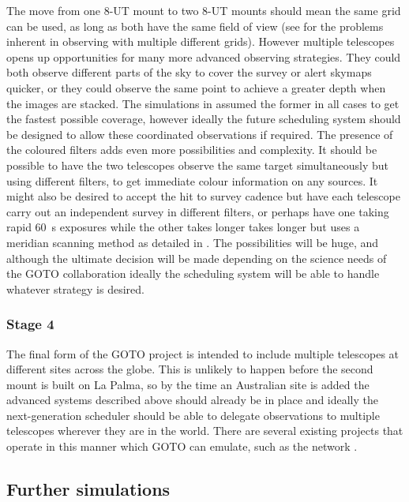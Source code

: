\begin{colsection}
\begin{colsection}
The move from one 8-UT mount to two 8-UT mounts should mean the same grid can be used, as long as both have the same field of view (see  for the problems inherent in observing with multiple different grids). However multiple telescopes opens up opportunities for many more advanced observing strategies. They could both observe different parts of the sky to cover the survey or alert skymaps quicker, or they could observe the same point to achieve a greater depth when the images are stacked. The simulations in  assumed the former in all cases to get the fastest possible coverage, however ideally the future scheduling system should be designed to allow these coordinated observations if required. The presence of the coloured filters adds even more possibilities and complexity. It should be possible to have the two telescopes observe the same target simultaneously but using different filters, to get immediate colour information on any sources. It might also be desired to accept the hit to survey cadence but have each telescope carry out an independent survey in different filters, or perhaps have one taking rapid \SI{60}{\second} exposures while the other takes longer takes longer but uses a meridian scanning method as detailed in . The possibilities will be huge, and although the ultimate decision will be made depending on the science needs of the GOTO collaboration ideally the scheduling system will be able to handle whatever strategy is desired.

\subsubsection{Stage 4}

The final form of the GOTO project is intended to include multiple telescopes at different sites across the globe. This is unlikely to happen before the second mount is built on La Palma, so by the time an Australian site is added the advanced systems described above should already be in place and ideally the next-generation scheduler should be able to delegate observations to multiple telescopes wherever they are in the world. There are several existing projects that operate in this manner which GOTO can emulate, such as the  network \citep{LCO_scheduling}.

\end{colsection}

\newpage
\subsection{Further simulations}
\label{sec:sim_future}
\begin{colsection}


\end{colsection}
\end{colsection}
